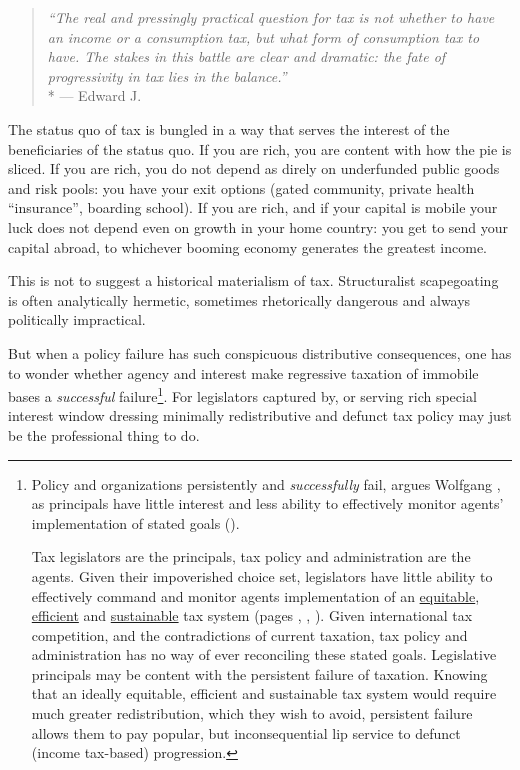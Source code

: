 \begin{quote}
	\emph{``The real and pressingly practical question for tax is not whether to have an income or a consumption tax, but what form of consumption tax to have.
	The stakes in this battle are clear and dramatic:
	the fate of progressivity in tax lies in the balance.''}
	\\*
	--- Edward J.\ \citet[817]{McCaffery2005}
\end{quote}

The status quo of tax is bungled in a way that serves the interest of the beneficiaries of the status quo.
If you are rich, you are content with how the pie is sliced.
If you are rich, you do not depend as direly on underfunded public goods and risk pools:
you have your exit options (gated community, private health ``insurance'', boarding school).
If you are rich, and if your capital is mobile your luck does not depend even on growth in your home country:
you get to send your capital abroad, to whichever booming economy generates the greatest income.

This is not to suggest a historical materialism of tax.
Structuralist scapegoating is often analytically hermetic, sometimes rhetorically dangerous and always politically impractical.

But when a policy failure has such conspicuous distributive consequences, one has to wonder whether agency and interest make regressive taxation of immobile bases a \emph{successful} failure\footnote{Policy and organizations persistently and \emph{successfully} fail, argues Wolfgang \citeauthor{Seibel-1996-aa}, as principals have little interest and less ability to effectively monitor agents' implementation of stated goals (\citeyear{Seibel-1996-aa}).

Tax legislators are the principals, tax policy and administration are the agents.
Given their impoverished choice set, legislators have little ability to effectively command and monitor agents implementation of an \hyperref[sec:Equity]{equitable}, \hyperref[sec:Efficiency]{efficient} and \hyperref[sec:Sustainability]{sustainable} tax system (pages \pageref{sec:Equity}, \pageref{sec:Efficiency}, \pageref{sec:Sustainability}).
Given international tax competition, and the contradictions of current taxation, tax policy and administration has no way of ever reconciling these stated goals.
Legislative principals may be content with the persistent failure of taxation.
Knowing that an ideally equitable, efficient and sustainable tax system would require much greater redistribution, which they wish to avoid, persistent failure allows them to pay popular, but inconsequential lip service to defunct (income tax-based) progression.}.
For legislators captured by, or serving rich special interest window dressing minimally redistributive and defunct tax policy may just be the professional thing to do.


